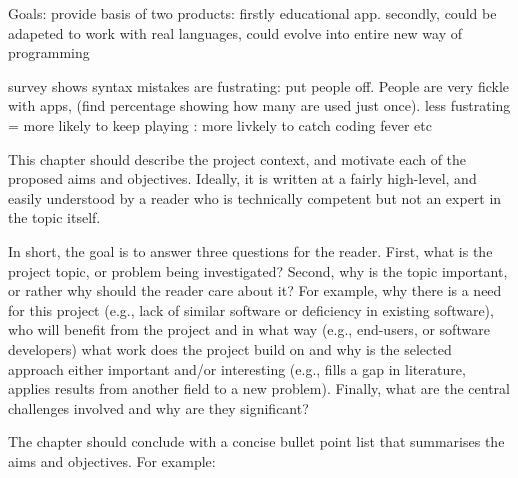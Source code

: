 \documentclass[ %
                    author={Jonathan Rankin},
                supervisor={Dr. David May, Dr. Ian Holyer},
                    degree={MEng},
                     title={CodeTouch},
                  subtitle={A Revolutionary Way To Program Real Code On Touch Screen Devices},
                      type={enterprise},
                      year={2015 } ]{dissertation}
\begin{document}
Goals: provide basis of two products: firstly educational app. secondly, could be adapeted to work with real languages, could evolve into entire new way of programming

survey shows syntax mistakes are fustrating: put people off. People are very fickle with apps, (find percentage showing how many are used just once). less fustrating = more likely to keep playing : more livkely to catch coding fever etc








This chapter should describe the project context, and motivate each of
the proposed aims and objectives.  Ideally, it is written at a fairly 
high-level, and easily understood by a reader who is technically 
competent but not an expert in the topic itself.

In short, the goal is to answer three questions for the reader.  First, 
what is the project topic, or problem being investigated?  Second, why 
is the topic important, or rather why should the reader care about it?  
For example, why there is a need for this project (e.g., lack of similar 
software or deficiency in existing software), who will benefit from the 
project and in what way (e.g., end-users, or software developers) what 
work does the project build on and why is the selected approach either
important and/or interesting (e.g., fills a gap in literature, applies
results from another field to a new problem).  Finally, what are the 
central challenges involved and why are they significant? 
 
The chapter should conclude with a concise bullet point list that 
summarises the aims and objectives.  For example:
\end{document}
